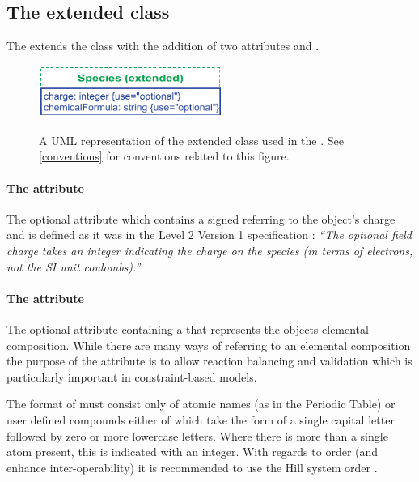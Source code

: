 \subsection{The extended  class}
\label{species-class}

The \FBCPackage extends the \sbmlthreecore \Species class with the addition
of two attributes  and .
%
\begin{figure}[h]
  \centering
  \includegraphics[width=6cm]{images/v2harmony_fbc_species.pdf}\\
  \caption{A UML representation of the extended \SBML \Species class used in
  the \FBCPackage. See \ref{conventions} for conventions related to this
  figure.}
  \label{fig:fbc_uml_species}
\end{figure}


\paragraph{The  attribute}
The optional attribute  which contains a signed
 referring to the \Species object's charge and is
defined as it was in the \SBML Level 2 Version 1 specification
: \textit{``The optional field charge takes an integer indicating
the charge on the species (in terms of electrons, not the SI unit coulombs).''}

\paragraph{The  attribute}
\label{chemicalFormula-attribute}
The optional attribute  containing a
 that represents the \Species objects elemental
composition.
%
%
While there are many ways of referring to an elemental composition the purpose
of the  attribute is to allow reaction balancing and
validation which is particularly important in constraint-based models.

The format of  must consist only of atomic names (as in
the Periodic Table) or user defined compounds either of which take the form of
a single capital letter followed by zero or more lowercase letters. Where there
is more than a single atom present, this is indicated with an integer. With
regards to order (and enhance inter-operability) it is recommended to use the
Hill system order \citep{hillsystem, hillwikipedia}.

